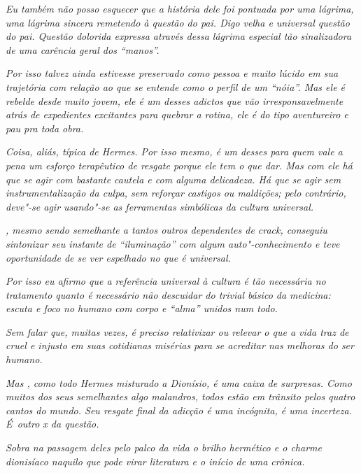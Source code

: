 \emph{Eu também não posso esquecer que a história dele foi pontuada por
uma lágrima, uma lágrima sincera remetendo à questão do pai. Digo velha
e universal questão do pai. Questão dolorida expressa através dessa
lágrima especial tão sinalizadora de uma carência geral dos ``manos''.}~

\emph{Por isso  talvez ainda estivesse preservado como pessoa e muito
lúcido em sua trajetória com relação ao que se entende como o perfil de
um ``nóia''. Mas ele é rebelde desde muito jovem, ele é um desses
adictos que vão irresponsavelmente atrás de expedientes excitantes para
quebrar a rotina, ele é do tipo aventureiro e pau pra toda obra.}~

\emph{Coisa, aliás, típica de Hermes. Por isso mesmo,  é um desses
para quem vale a pena um esforço terapêutico de resgate porque ele tem o
que dar. Mas com ele há que se agir com bastante cautela e com alguma
delicadeza. Há que se agir sem instrumentalização da culpa, sem reforçar
castigos ou maldições; pelo contrário, deve"-se agir usando"-se as
ferramentas simbólicas da cultura universal.}~

\emph{, mesmo sendo semelhante a tantos outros dependentes de crack,
conseguiu sintonizar seu instante de ``iluminação'' com algum
auto"-conhecimento e teve oportunidade de se ver espelhado no que é
universal.}~

\emph{Por isso eu afirmo que a referência universal à cultura é tão
necessária no tratamento quanto é necessário não descuidar do trivial
básico da medicina: escuta e foco no humano com corpo e ``alma'' unidos
num todo.}~

\emph{Sem falar que, muitas vezes, é preciso relativizar ou relevar o
que a vida traz de cruel e injusto em suas cotidianas misérias para se
acreditar nas melhoras do ser humano.}~

\emph{Mas , como todo Hermes misturado a Dionísio, é uma caixa de
surpresas. Como muitos dos seus semelhantes algo malandros, todos estão
em trânsito pelos quatro cantos do mundo. Seu resgate final da adicção é
uma incógnita, é uma incerteza. É~outro x da questão.}~

\emph{Sobra na passagem deles pelo palco da vida o brilho hermético e o
charme dionisíaco naquilo que pode virar literatura e o início de uma
crônica.~}
